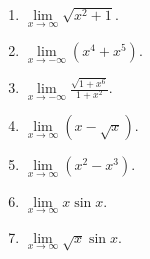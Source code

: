 \begin{multicols}{3}
\begin{enumerate}
\answer{$\infty$}
\item $\lim\limits_{x\to\infty}\sqrt{x^2+1}$.

\answer{$\infty$}
\item $\lim\limits_{x\to-\infty}(x^4+x^5)$.

\answer{$-\infty$}
\item $\lim\limits_{x\to-\infty}\frac{\sqrt{1+x^6}}{1+x^2}$.

\answer{$\infty$}
\item $\lim\limits_{x\to\infty}(x-\sqrt{x})$.

\answer{$\infty$}
\item $\lim\limits_{x\to\infty}(x^2-x^3)$.

\answer{$-\infty$}
\item $\lim\limits_{x\to\infty}x\sin x$.

\item $\lim\limits_{x\to\infty}\sqrt{x}\sin x$.

\end{enumerate}
\end{multicols}